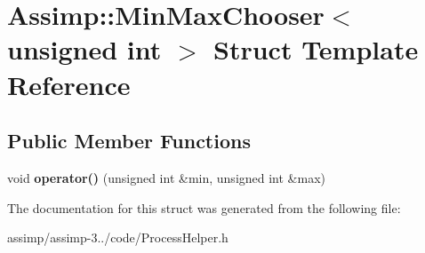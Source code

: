 \hypertarget{struct_assimp_1_1_min_max_chooser_3_01unsigned_01int_01_4}{\section{Assimp\+:\+:Min\+Max\+Chooser$<$ unsigned int $>$ Struct Template Reference}
\label{struct_assimp_1_1_min_max_chooser_3_01unsigned_01int_01_4}
}
\subsection*{Public Member Functions}
\begin{DoxyCompactItemize}
\item 
\hypertarget{struct_assimp_1_1_min_max_chooser_3_01unsigned_01int_01_4_aae432b05fee65e3acc55777852862c1a}{void {\bfseries operator()} (unsigned int \&min, unsigned int \&max)}\label{struct_assimp_1_1_min_max_chooser_3_01unsigned_01int_01_4_aae432b05fee65e3acc55777852862c1a}

\end{DoxyCompactItemize}


The documentation for this struct was generated from the following file\+:\begin{DoxyCompactItemize}
\item 
assimp/assimp-\/3../code/Process\+Helper.\+h\end{DoxyCompactItemize}
